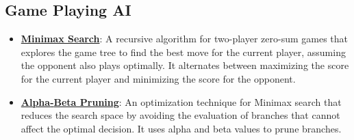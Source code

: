 \documentclass{article}%
\begin{document}
%
\subsection{Game Playing AI}%
\label{subsec:GamePlayingAI}%
\begin{itemize}[leftmargin=*]%
\item \href{https://purdue.brightspace.com/d2l/common/assets/pdfjs-d2l-dist/1.0.14-legacy/web/viewer.html?file=\%2Fcontent\%2Fenforced\%2F1095467-wl.202510.CS.24300.001\%2F02L2-Intro.pdf\%3Fou\%3D1095467\&lang=en-us\&container=d2l-fileviewer-rendered-pdf\&fullscreen=d2l-fileviewer-rendered-pdf-dialog\&height=667#page=22}{\textbf{Minimax Search}}: A recursive algorithm for two{-}player zero{-}sum games that explores the game tree to find the best move for the current player, assuming the opponent also plays optimally. It alternates between maximizing the score for the current player and minimizing the score for the opponent.%
\item \href{https://purdue.brightspace.com/d2l/common/assets/pdfjs-d2l-dist/1.0.14-legacy/web/viewer.html?file=\%2Fcontent\%2Fenforced\%2F1095467-wl.202510.CS.24300.001\%2F02L2-Intro.pdf\%3Fou\%3D1095467\&lang=en-us\&container=d2l-fileviewer-rendered-pdf\&fullscreen=d2l-fileviewer-rendered-pdf-dialog\&height=667#page=23}{\textbf{Alpha{-}Beta Pruning}}: An optimization technique for Minimax search that reduces the search space by avoiding the evaluation of branches that cannot affect the optimal decision. It uses alpha and beta values to prune branches.%
\end{itemize}

%
\end{document}
